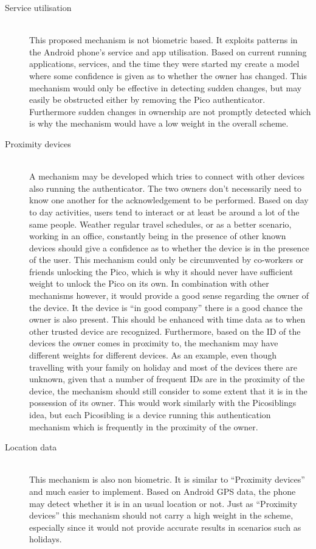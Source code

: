 \begin{description}
  \item[Service utilisation] \hfill \\
  This proposed mechanism is not biometric based. It exploits patterns in the Android phone's service and app utilisation. Based on current running applications, services, and the time they were started my create a model where some confidence is given as to whether the owner has changed. This mechanism would only be effective in detecting sudden changes, but may easily be obstructed either by removing the Pico authenticator. Furthermore sudden changes in ownership are not promptly detected which is why the mechanism would have a low weight in the overall scheme. 
  
  \item[Proximity devices] \hfill \\
  A mechanism may be developed which tries to connect with other devices also running the authenticator. The two owners don't necessarily need to know one another for the acknowledgement to be performed. Based on day to day activities, users tend to interact or at least be around a lot of the same people. Weather regular travel schedules, or as a better scenario, working in an office, constantly being in the presence of other known devices should give a confidence as to whether the device is in the presence of the user. This mechanism could only be circumvented by co-workers or friends unlocking the Pico, which is why it should never have sufficient weight to unlock the Pico on its own. In combination with other mechanisms however, it would provide a good sense regarding the owner of the device. It the device is ``in good company'' there is a good chance the owner is also present. This should be enhanced with time data as to when other trusted device are recognized. Furthermore, based on the ID of the devices the owner comes in proximity to, the mechanism may have different weights for different devices. As an example, even though travelling with your family on holiday and most of the devices there are unknown, given that a number of frequent IDs are in the proximity of the device, the mechanism should still consider to some extent that it is in the possession of its owner. This would work similarly with the Picosiblings idea, but each Picosibling is a device running this authentication mechanism which is frequently in the proximity of the owner.
  
  \item[Location data] \hfill \\
  This mechanism is also non biometric. It is similar to ``Proximity devices'' and much easier to implement. Based on Android GPS data, the phone may detect whether it is in an usual location or not. Just as ``Proximity devices'' this mechanism should not carry a high weight in the scheme, especially since it would not provide accurate results in scenarios such as holidays.
  

\end{description}
